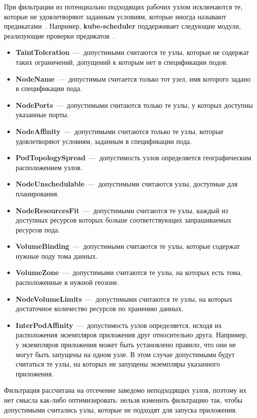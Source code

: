 При фильтрации из потенциально подходящих рабочих узлом исключаются те, которые не удовлетворяют заданным условиям, которые иногда называют предикатами~\cite{rejiba2022custom}. Например, \textbf{kube-scheduler} поддерживает следующие модули, реализующие проверки предикатов~\cite{scheduler_profiles}.

\begin{itemize}
	\item \textbf{TaintToleration}~---~допустимыми считаются те узлы, которые не содержат таких ограничений, допущений к которым нет в спецификации подов. 
	\item \textbf{NodeName}~---~допустимым считается только тот узел, имя которого задано в спецификации пода.
	\item \textbf{NodePorts}~---~допустимыми считаются только те узлы, у которых доступны указанные порты.
	\item \textbf{NodeAffinity}~---~допустимыми считаются только те узлы, которые удовлетворяют условиям, заданным в спецификации пода.
	\item \textbf{PodTopologySpread}~---~допустимость узлов определяется географическим расположением узлов.
	\item \textbf{NodeUnschedulable}~---~допустимыми считаются узлы, доступные для планирования.
	\item \textbf{NodeResourcesFit}~---~допустимыми считаются те узлы, каждый из доступных ресурсов которых больше соответствующих запрашиваемых ресурсов пода.
	\item \textbf{VolumeBinding}~---~допустимыми считаются те узлы, которые содержат нужные поду тома данных.
	\item \textbf{VolumeZone}~---~допустимыми считаются те узлы, на которых есть тома, расположенные в нужной геозоне.
	\item \textbf{NodeVolumeLimits}~---~допустимыми считаются те узлы, на которых достаточное количество ресурсов по хранению данных.
	\item \textbf{InterPodAffinity}~---~допустимость узлов определяется, исходя их расположения экземпляров приложения друг относительно друга. Например, у экземпляров приложения может быть установлено правило, что они не могут быть запущены на одном узле. В этом случае допустимыми будут считаться те узлы, на которых не запущены экземпляры указанного приложения.
\end{itemize}

Фильтрация рассчитана на отсечение заведомо неподходящих узлов, поэтому их нет смысла как-либо оптимизировать: нельзя изменить фильтрацию так, чтобы допустимыми считались узлы, которые не подходят для запуска приложения.

